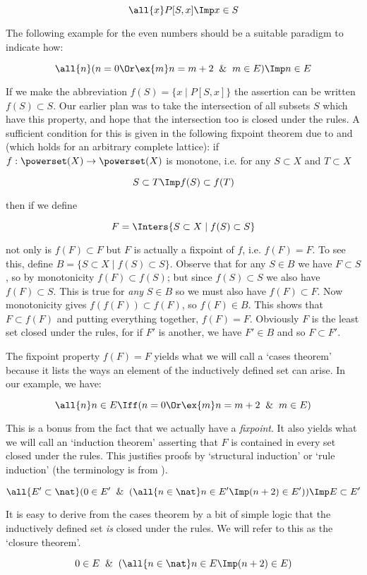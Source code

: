 $$ \all{x} P[S,x] \Imp x \in S $$

\noindent The following example for the even numbers should be a suitable
paradigm to indicate how:

$$\all{n} (n = 0 \Or \ex{m} n = m + 2 \And m \in E) \Imp n \in E $$

If we make the abbreviation $f(S) = \{x \mid P[S,x]\}$ the assertion can be
written $f(S) \subset S$. Our earlier plan was to take the intersection of all
subsets $S$ which have this property, and hope that the intersection too is
closed under the rules. A sufficient condition for this is given in the
following fixpoint theorem due to  and  (which
holds for an arbitrary complete lattice): if $f:\powerset(X) \to \powerset(X)$
is monotone, i.e. for any $S \subset X$ and $T \subset X$

$$ S \subset T \Imp f(S) \subset f(T) $$

\noindent then if we define

$$ F = \Inters \{ S \subset X \mid f(S) \subset S \} $$

\noindent not only is $f(F) \subset F$ but $F$ is actually a fixpoint of $f$,
i.e. $f(F) = F$. To see this, define $B = \{ S \subset X \mid f(S) \subset S
\}$. Observe that for any $S \in B$ we have $F \subset S$, so by monotonicity
$f(F) \subset f(S)$; but since $f(S) \subset S$ we also have $f(F) \subset S$.
This is true for {\em any} $S \in B$ so we must also have $f(F) \subset F$.
Now monotonicity gives $f(f(F)) \subset f(F)$, so $f(F) \in B$. This shows that
$F \subset f(F)$ and putting everything together, $f(F) = F$. Obviously $F$ is
the least set closed under the rules, for if $F'$ is another, we have $F' \in
B$ and so $F \subset F'$.

The fixpoint property $f(F) = F$ yields what we will call a `cases theorem'
because it lists the ways an element of the inductively defined set can arise.
In our example, we have:

$$\all{n} n \in E \Iff (n = 0 \Or \ex{m} n = m + 2 \And m \in E) $$

This is a bonus from the fact that we actually have a {\em fixpoint}. It also
yields what we will call an `induction theorem' asserting that $F$ is contained
in every set closed under the rules. This justifies proofs by `structural
induction' or `rule induction' (the terminology is from ).

$$ \all{E' \subset \nat} (0 \in E' \And (\all{n \in \nat} n \in E' \Imp (n + 2)
   \in E')) \Imp E \subset E' $$

It is easy to derive from the cases theorem by a bit of simple logic that the
inductively defined set {\em is} closed under the rules. We will refer to this
as the `closure theorem'.

$$ 0 \in E \And (\all{n \in \nat} n \in E \Imp (n + 2) \in E) $$
